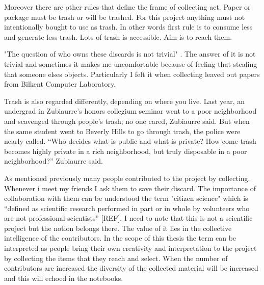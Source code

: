 

Moreover there are other rules that define the frame of collecting act. Paper or package must be trash or will be trashed. For this project anything must not intentionally bought to use as trash. In other words first rule is to consume less and generate less trash. Lots of trash is accessible. Aim is to reach them.

"The question of who owns these discards is not trivial" \cite{zimring2012encyclopedia}. The answer of it is not trivial and sometimes it makes me uncomfortable because of feeling that stealing that someone elses objects. Particularly I felt it when collecting leaved out papers from Bilkent Computer Laboratory.

Trash is also regarded differently, depending on where you live. Last year, an undergrad in Zubiaurre’s honors collegium seminar went to a poor neighborhood and scavenged through people’s trash; no one cared, Zubiaurre said. But when the same student went to Beverly Hills to go through trash, the police were nearly called. “Who decides what is public and what is private? How come trash becomes highly private in a rich neighborhood, but truly disposable in a poor neighborhood?” Zubiaurre said.


As mentioned previously many people contributed to the project by collecting. Whenever i meet my friends I ask them to save their discard. The importance of collaboration with them can be understood the term "citizen science" which is “defined as scientific research performed in part or in whole by volunteers who are not professional scientists” [REF]. I need to note that this is not a scientific project but the notion belongs there. The value of it lies in the collective intelligence of the contributors. In the scope of this thesis the term can be interpreted as people bring their own creativity and interpretation to the project by collecting the items that they reach and select. When the number of contributors are increased the diversity of the collected material will be increased and this will echoed in the notebooks. 

